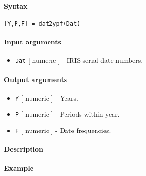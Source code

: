 


	\paragraph{Syntax}

\begin{verbatim}
[Y,P,F] = dat2ypf(Dat)
\end{verbatim}

\paragraph{Input arguments}

\begin{itemize}
\itemsep1pt\parskip0pt
\item
  \texttt{Dat} {[} numeric {]} - IRIS serial date numbers.
\end{itemize}

\paragraph{Output arguments}

\begin{itemize}
\item
  \texttt{Y} {[} numeric {]} - Years.
\item
  \texttt{P} {[} numeric {]} - Periods within year.
\item
  \texttt{F} {[} numeric {]} - Date frequencies.
\end{itemize}

\paragraph{Description}

\paragraph{Example}


